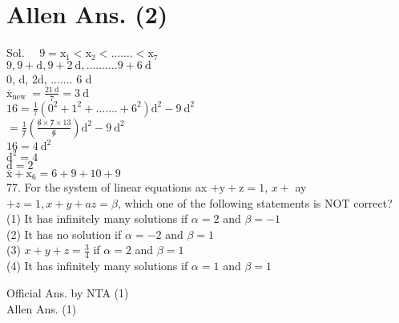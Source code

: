 \documentclass[10pt]{article}
\begin{document}
\section*{Allen Ans. (2)}
Sol. \(\quad 9=\mathrm{x}_{1}<\mathrm{x}_{2}<\ldots \ldots .<\mathrm{x}_{7}\)\\
\(9,9+\mathrm{d}, 9+2 \mathrm{~d}, \ldots \ldots \ldots .9+6 \mathrm{~d}\)\\
0, d, 2d, ....... 6 d\\
\(\overline{\mathrm{x}}_{\text {new }}=\frac{21 \mathrm{~d}}{7}=3 \mathrm{~d}\)\\
\(16=\frac{1}{7}\left(0^{2}+1^{2}+\ldots \ldots .+6^{2}\right) \mathrm{d}^{2}-9 \mathrm{~d}^{2}\)\\
\(=\frac{1}{\not 7}\left(\frac{\not 6 \times \not 7 \times 13}{\not 6}\right) \mathrm{d}^{2}-9 \mathrm{~d}^{2}\)\\
\(16=4 \mathrm{~d}^{2}\)\\
\(\mathrm{d}^{2}=4\)\\
\(\mathrm{d}=2\)\\
\(\overline{\mathrm{x}}+\mathrm{x}_{6}=6+9+10+9\)\\
77. For the system of linear equations ax \(+\mathrm{y}+\mathrm{z}=1\), \(x+\) ay \(+z=1, x+y+a z=\beta\), which one of the following statements is NOT correct?\\
(1) It has infinitely many solutions if \(\alpha=2\) and \(\beta=-1\)\\
(2) It has no solution if \(\alpha=-2\) and \(\beta=1\)\\
(3) \(x+y+z=\frac{3}{4}\) if \(\alpha=2\) and \(\beta=1\)\\
(4) It has infinitely many solutions if \(\alpha=1\) and \(\beta=1\)

Official Ans. by NTA (1)\\
Allen Ans. (1)
\end{document}
